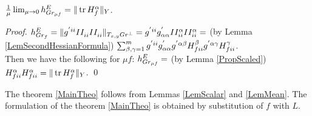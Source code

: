 \documentclass{llncs}
\newcommand {\tr}{{\,}\mathrm{tr}{\,}}
\begin{document}
\begin{lemma} \label{LemMean}
$\frac{1}{\mu}\lim_{\mu\to 0} \tensor*{h}{^E_{Gr_{\mu f}}} = \|\tr H_f^\alpha\|_Y$.
\end{lemma}

\begin{proof}
$\tensor*{h}{^E_{Gr_f}} = \| g^{'ii} \tensor*{II}{_i_i} \tensor*{II}{_i_i} \|_{T_{x, y}Gr^{\bot}}
= g^{'ii} g^{'}_{\alpha \alpha} \tensor*{II}{^\alpha _i_i} \tensor*{II}{^\alpha _i_i} = $ (by Lemma \ref{LemSecondHessianFormula}) 
$\sum_{\beta, \gamma = 1}^{m} g^{'ii} g^{'}_{\alpha \alpha} g^{'\alpha\beta} \tensor*{H}{_f^\beta _i_i} g^{'\alpha\gamma} \tensor*{H}{_f^\gamma _i_i}$.
\\
Then we have the following for $\mu f$:
$\tensor*{h}{^E_{Gr_{\mu f}}} 
=$ (by Lemma \ref{PropScaled}) $\tensor*{H}{_f^\alpha _i_i} \tensor*{H}{_f^\alpha _i_i}
= \|\tr H_f^\alpha\|_Y$.
\qed
\end{proof}

The theorem \ref{MainTheo} follows from Lemmas \ref{LemScalar} and \ref{LemMean}. The formulation of the theorem \ref{MainTheo} is obtained by substitution of $f$ with $L$.
\end{document}
